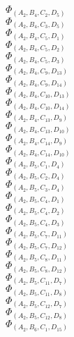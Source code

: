 \documentclass[14pt]{article}
\begin{document}
    $\Phi_{({A}_{2}, {B}_{4}, {C}_{2}, {D}_{5})}$ \\ 
    $\Phi_{({A}_{2}, {B}_{4}, {C}_{3}, {D}_{5})}$ \\ 
    $\Phi_{({A}_{2}, {B}_{4}, {C}_{5}, {D}_{1})}$ \\ 
    $\Phi_{({A}_{2}, {B}_{4}, {C}_{5}, {D}_{2})}$ \\ 
    $\Phi_{({A}_{2}, {B}_{4}, {C}_{5}, {D}_{3})}$ \\ 
    $\Phi_{({A}_{2}, {B}_{4}, {C}_{9}, {D}_{13})}$ \\ 
    $\Phi_{({A}_{2}, {B}_{4}, {C}_{9}, {D}_{14})}$ \\ 
    $\Phi_{({A}_{2}, {B}_{4}, {C}_{10}, {D}_{13})}$ \\ 
    $\Phi_{({A}_{2}, {B}_{4}, {C}_{10}, {D}_{14})}$ \\ 
    $\Phi_{({A}_{2}, {B}_{4}, {C}_{13}, {D}_{9})}$ \\ 
    $\Phi_{({A}_{2}, {B}_{4}, {C}_{13}, {D}_{10})}$ \\ 
    $\Phi_{({A}_{2}, {B}_{4}, {C}_{14}, {D}_{9})}$ \\ 
    $\Phi_{({A}_{2}, {B}_{4}, {C}_{14}, {D}_{10})}$ \\ 
    $\Phi_{({A}_{2}, {B}_{5}, {C}_{1}, {D}_{4})}$ \\ 
    $\Phi_{({A}_{2}, {B}_{5}, {C}_{2}, {D}_{4})}$ \\ 
    $\Phi_{({A}_{2}, {B}_{5}, {C}_{3}, {D}_{4})}$ \\ 
    $\Phi_{({A}_{2}, {B}_{5}, {C}_{4}, {D}_{1})}$ \\ 
    $\Phi_{({A}_{2}, {B}_{5}, {C}_{4}, {D}_{2})}$ \\ 
    $\Phi_{({A}_{2}, {B}_{5}, {C}_{4}, {D}_{3})}$ \\ 
    $\Phi_{({A}_{2}, {B}_{5}, {C}_{7}, {D}_{11})}$ \\ 
    $\Phi_{({A}_{2}, {B}_{5}, {C}_{7}, {D}_{12})}$ \\ 
    $\Phi_{({A}_{2}, {B}_{5}, {C}_{8}, {D}_{11})}$ \\ 
    $\Phi_{({A}_{2}, {B}_{5}, {C}_{8}, {D}_{12})}$ \\ 
    $\Phi_{({A}_{2}, {B}_{5}, {C}_{11}, {D}_{7})}$ \\ 
    $\Phi_{({A}_{2}, {B}_{5}, {C}_{11}, {D}_{8})}$ \\ 
    $\Phi_{({A}_{2}, {B}_{5}, {C}_{12}, {D}_{7})}$ \\ 
    $\Phi_{({A}_{2}, {B}_{5}, {C}_{12}, {D}_{8})}$ \\ 
    $\Phi_{({A}_{2}, {B}_{6}, {C}_{1}, {D}_{15})}$ \\ 
\end{document}
